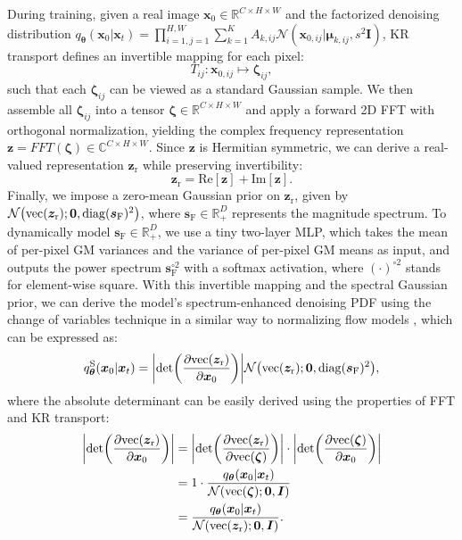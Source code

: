 \documentclass{article}
\def\vmu{{\bm{\mu}}}
\def\vtheta{{\bm{\theta}}}
\def\vs{{\bm{s}}}
\def\vx{{\bm{x}}}
\def\vz{{\bm{z}}}
\def\mI{{\bm{I}}}
\newcommand{\R}{\mathbb{R}}
\theoremstyle{custom}
\theoremstyle{definition}
\theoremstyle{remark}
\let\originalleft\left
\let\originalright\right
\renewcommand{\left}{\mathopen{}\mathclose\bgroup\originalleft}
\renewcommand{\right}{\aftergroup\egroup\originalright}
\newcommand{\diag}{\mathop{\mathrm{diag}}}
\let\originalpartial\partial
\renewcommand{\partial}{\mathop{}\!\mathrm{\originalpartial}}
\begin{document}
During training, given a real image $\vx_0 \in \R^{C\times H\times W}$ and the factorized denoising distribution $q_\vtheta (\vx_0|\vx_t) = \prod_{i=1,j=1}^{H,W} \sum_{k=1}^K A_{k,ij} \mathcal{N}(\vx_{0,ij} | \vmu_{k,ij}, s^2 \mI)$, KR transport defines an invertible mapping for each pixel:
\begin{equation}
    T_{ij}: \vx_{0, ij} \mapsto \bm{\zeta}_{ij},
\end{equation}
such that each $\bm{\zeta}_{ij}$ can be viewed as a standard Gaussian sample. We then assemble all $\bm{\zeta}_{ij}$ into a tensor $\bm{\zeta}\in \R^{C\times H\times W}$ and apply a forward 2D FFT with orthogonal normalization, yielding the complex frequency representation $\vz = \mathit{FFT}(\bm{\zeta}) \in \mathbb{C}^{C\times H\times W}$. Since $\vz$ is Hermitian symmetric, we can derive a real-valued representation $\vz_\text{r}$ while preserving invertibility:
\begin{equation}
    \vz_\text{r} = \mathrm{Re}[\vz] + \mathrm{Im}[\vz].
\end{equation}
Finally, we impose a zero-mean Gaussian prior on $\vz_\text{r}$, given by $\mathcal{N}\left(\mathrm{vec}(\vz_\text{r}); \bm{0}, \diag(\vs_\text{F})^2\right)$, where $\vs_\text{F}\in \R_+^D$ represents the magnitude spectrum. To dynamically model $\vs_\text{F}\in \R_+^D$, we use a tiny two-layer MLP, which takes the mean of per-pixel GM variances and the variance of per-pixel GM means as input, and outputs the power spectrum $\vs_\text{F}^{\circ 2}$ with a softmax activation, where $(\cdot)^{\circ 2}$ stands for element-wise square. With this invertible mapping and the spectral Gaussian prior, we can derive the model's spectrum-enhanced denoising PDF using the change of variables technique in a similar way to normalizing flow models \cite{normflow}, which can be expressed as:
\begin{equation}
    q_\vtheta^\text{S}(\vx_0|\vx_t) = \left|\det\left(\frac{\partial \mathrm{vec}(\vz_\text{r})}{\partial \vx_0}\right)\right| \mathcal{N}\left(\mathrm{vec}(\vz_\text{r}); \bm{0}, \diag(\vs_\text{F})^2\right),
    \label{eq:spectral1}
\end{equation}
where the absolute determinant can be easily derived using the properties of FFT and KR transport:
\begin{align}
    \left|\det\left(\frac{\partial \mathrm{vec}(\vz_\text{r})}{\partial \vx_0}\right)\right| 
    &= \left| \det\left(\frac{\partial \mathrm{vec}(\vz_\text{r})}{\partial \mathrm{vec}(\bm{\zeta})}\right) \right| \cdot \left|\det\left(\frac{\partial \mathrm{vec}(\bm{\zeta})}{\partial \vx_0}\right)\right| \notag\\
    &= 1 \cdot \frac{q_\vtheta (\vx_0|\vx_t)}{\mathcal{N}(\mathrm{vec}(\bm{\zeta}); \bm{0}, \mI)} \notag\\
    &= \frac{q_\vtheta (\vx_0|\vx_t)}{\mathcal{N}(\mathrm{vec}(\vz_\text{r}); \bm{0}, \mI)}.
    \label{eq:spectral2}
\end{align}
\end{document}
